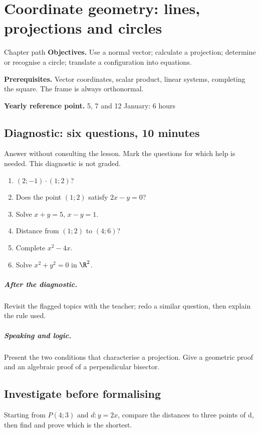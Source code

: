 \chapter{Coordinate geometry: lines, projections and circles}\label{C07}
\begin{repere}{Chapter path}
\textbf{Objectives.} Use a normal vector; calculate a projection; determine or recognise a circle; translate a configuration into equations.

\textbf{Prerequisites.} Vector coordinates, scalar product, linear systems, completing the square. The frame is always orthonormal.

\textbf{Yearly reference point.} 5, 7 and 12 January: 6 hours\end{repere}
\section*{Diagnostic: six questions, 10 minutes}\label{C07-D}
Answer without consulting the lesson. Mark the questions for which help is needed. This diagnostic is not graded.
\begin{enumerate}
\item $(2;-1)\cdot(1;2)$?
\item Does the point $(1;2)$ satisfy $2x-y=0$?
\item Solve $x+y=5$, $x-y=1$.
\item Distance from $(1;2)$ to $(4;6)$?
\item Complete $x^2-4x$.
\item Solve $x^2+y^2=0$ in $\R^2$.
\end{enumerate}
\paragraph{After the diagnostic.} Revisit the flagged topics with the teacher; redo a similar question, then explain the rule used.
\paragraph{Speaking and logic.} Present the two conditions that characterise a projection. Give a geometric proof and an algebraic proof of a perpendicular bisector.
\clearpage
\section*{Investigate before formalising}\label{C07-RECH}
Starting from $P(4;3)$ and $d:y=2x$, compare the distances to three points of d, then find and prove which is the shortest.

